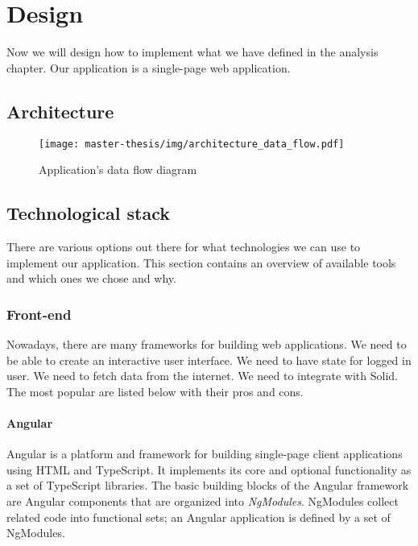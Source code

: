 \chapter{Design}
Now we will design how to implement what we have defined in the analysis chapter.
Our application is a single-page web application.

\section{Architecture}
\begin{figure}[h]
  \centering
  \texttt{[image: master-thesis/img/architecture\_data\_flow.pdf]}
  \caption{Application's data flow diagram}
\end{figure}

\section{Technological stack}
There are various options out there for what technologies we can use to implement our application.
This section contains an overview of available tools and which ones we chose and why.

\subsection{Front-end}
Nowadays, there are many frameworks for building web applications.
We need to be able to create an interactive user interface.
We need to have state for logged in user.
We need to fetch data from the internet.
We need to integrate with Solid.
The most popular are listed below with their pros and cons.

\subsubsection*{Angular}
Angular is a platform and framework for building single-page client applications using HTML and TypeScript. 
It implements its core and optional functionality as a set of TypeScript libraries. 
The basic building blocks of the Angular framework are Angular components that are organized into \emph{NgModules}. 
NgModules collect related code into functional sets; an Angular application is defined by a set of NgModules.

